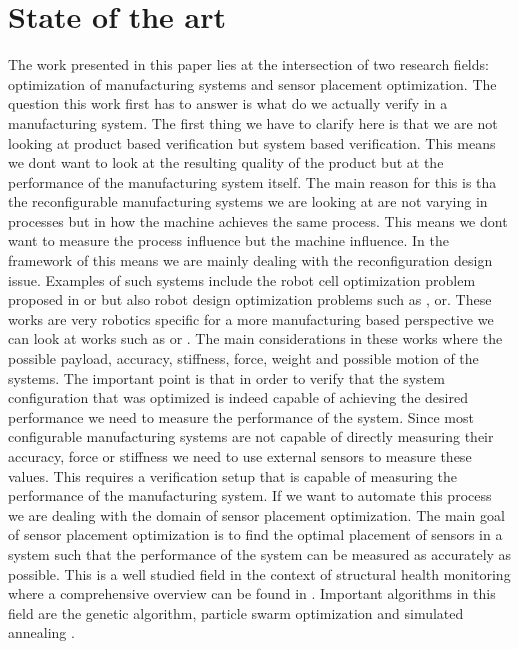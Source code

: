 \documentclass{svproc}
\begin{document}
\section{State of the art}
The work presented in this paper lies at the intersection of two research fields: optimization of manufacturing systems and sensor placement optimization.
The question this work first has to answer is what do we actually verify in a manufacturing system.
The first thing we have to clarify here is that we are not looking at product based verification but system based verification.
This means we dont want to look at the resulting quality of the product but at the performance of the manufacturing system itself.
The main reason for this is tha the reconfigurable manufacturing systems we are looking at are not varying in processes but in how the machine achieves the same process.
This means we dont want to measure the process influence but the machine influence.
In the framework of \cite{reconfigurable_production} this means we are mainly dealing with the reconfiguration design issue.
Examples of such systems include the robot cell optimization problem proposed in \cite{previous_work} or \cite{stiffness_placement} 
but also robot design optimization problems such as \cite{task_synthesis}, \cite{ad-hoc_manipulator} or\cite{multi_objective}.
These works are very robotics specific for a more manufacturing based perspective we can look at works such as \cite{johannes_1} or \cite{johannes_2}.
The main considerations in these works where the possible payload, accuracy, stiffness, force, weight and possible motion of the systems.
The important point is that in order to verify that the system configuration that was optimized is indeed capable of achieving the desired performance we need to measure the performance of the system.
Since most configurable manufacturing systems are not capable of directly measuring their accuracy, force or stiffness we need to use external sensors to measure these values.
This requires a verification setup that is capable of measuring the performance of the manufacturing system.
If we want to automate this process we are dealing with the domain of sensor placement optimization.
The main goal of sensor placement optimization is to find the optimal placement of sensors in a system such that the performance of the system can be measured as accurately as possible.
This is a well studied field in the context of structural health monitoring where a comprehensive overview can be found in \cite{shms}.
Important algorithms in this field are the genetic algorithm, particle swarm optimization and simulated annealing \cite{shms}.
\end{document}

